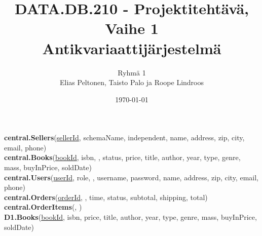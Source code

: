 \title{DATA.DB.210 - Projektitehtävä, Vaihe 1 \\ \large Antikvariaattijärjestelmä}
\author{Ryhmä 1 \\ \small Elias Peltonen, Taisto Palo ja Roope Lindroos}
\date{\today}

\noindent
\textbf{central.Sellers}(\underline{sellerId}, schemaName, independent, name, address, zip, city, email, phone) \\[0.5em]
\textbf{central.Books}(\underline{bookId}, isbn, , status, price, title, author, year, type, genre, mass, buyInPrice, soldDate) \\[0.5em]
\textbf{central.Users}(\underline{userId}, role, , username, password, name, address, zip, city, email, phone) \\[0.5em]
\textbf{central.Orders}(\underline{orderId}, , time, status, subtotal, shipping, total) \\[0.5em]
\textbf{central.OrderItems}(, ) \\[0.5em]
\textbf{D1.Books}(\underline{bookId}, isbn, price, title, author, year, type, genre, mass, buyInPrice, soldDate) \\[0.5em]